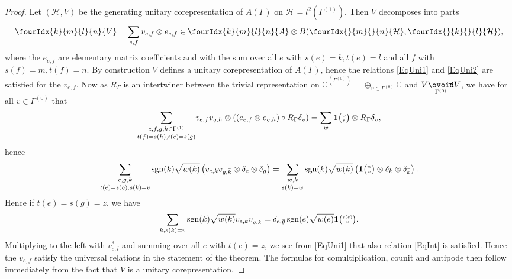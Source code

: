 \documentclass[10pt]{article}
\DeclareMathOperator{\sgn}{\mathrm{sgn}}
\newcommand{\Circtv}[1]{\underset{#1}{\mathop{\ooalign{$\ovoid$\cr\hidewidth\raise-.05ex\hbox{$\scriptstyle\mathsf T\mkern3.5mu$}\cr}}}} %
\newcommand{\C}{\mathbb{C}}
\newcommand{\Hsp}{\mathcal{H}}
\newcommand{\Grt}[3]{#1{\tiny{\begin{pmatrix} #2\\#3\end{pmatrix}}}}
\newcommand{\UnitC}[2]{\Grt{\mathbf{1}}{#1}{#2}}
\newcommand{\Gr}[5]{\fourIdx{#2}{#4}{#3}{#5}{#1}}%
\newcommand{\Gru}[3]{\Gr{#1}{}{}{#2}{#3}}
\theoremstyle{definition}
\numberwithin{equation}{section}
\begin{document}
\begin{proof} Let $(\Hsp,V)$ be the generating unitary corepresentation of $A(\Gamma)$ on $\Hsp = l^2(\Gamma^{(1)})$. Then $V$ decomposes into parts \[ \Gr{V}{k}{l}{m}{n} = \sum_{e,f} v_{e,f} \otimes e_{e,f} \in \Gr{A}{k}{l}{m}{n}\otimes B(\Gru{\Hsp}{m}{n},\Gru{\Hsp}{k}{l}),\] where the $e_{e,f}$ are elementary matrix coefficients and with the sum over all $e$ with $s(e)=k,t(e)=l$ and all $f$ with $s(f) = m, t(f)=n$. By construction $V$ defines a unitary corepresentation of $A(\Gamma)$, hence the relations \eqref{EqUni1} and \eqref{EqUni2} are satisfied for the $v_{e,f}$. Now as $R_{\Gamma}$ is an intertwiner between the trivial representation on $\C^{(\Gamma^{(0)})} = \oplus_{v\in \Gamma^{(0)}} \C$ and $V\Circtv{\Gamma^{(0)}} V$, we have for all $v\in \Gamma^{(0)}$ that \begin{equation}\label{EqMorR}\underset{t(f)=s(h),t(e)=s(g)}{\sum_{e,f,g,h\in \Gamma^{(1)}}} v_{e,f}v_{g,h}\otimes \left((e_{e,f}\otimes e_{g,h})\circ R_{\Gamma} \delta_v\right) = \sum_w \UnitC{w}{v}\otimes R_{\Gamma}\delta_v,\end{equation} hence
\[\underset{t(e)=s(g),s(k)=v}{\sum_{e,g,k}} \sgn(k)\sqrt{w(k)}\left( v_{e,k}v_{g,\bar{k}} \otimes \delta_e\otimes \delta_{g}\right) =\underset{s(k)=w}{\sum_{w,k}}\sgn(k)\sqrt{w(k)} \left(\UnitC{w}{v} \otimes \delta_k\otimes \delta_{\bar{k}}\right).\] Hence if $t(e) = s(g)=z$, we have \[\sum_{k,s(k)=v} \sgn(k)\sqrt{w(k)} v_{e,k}v_{g,\bar{k}} =  \delta_{e,\bar{g}} \sgn(e)\sqrt{w(e)}\UnitC{s(e)}{v}.\] Multiplying to the left with $v_{e,l}^*$ and summing over all $e$ with $t(e) = z$, we see from \eqref{EqUni1} that also relation \eqref{EqInt} is satisfied. Hence the $v_{e,f}$ satisfy the universal relations in the statement of the theorem. The formulas for comultiplication, counit and antipode then follow immediately from the fact that $V$ is a unitary corepresentation.


\end{proof}
\end{document}
